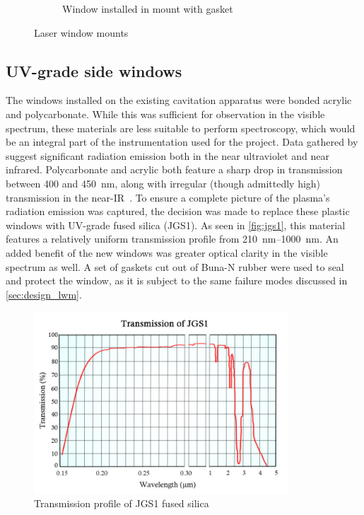 \begin{figure}[h]
\begin{subfigure}[t]{0.48\textwidth}
                    \caption{Window installed in mount with gasket}
                    \label{fig:windowMount_installed}
                \end{subfigure}
                \caption{Laser window mounts}
                \label{fig:windowMount}
            \end{figure}

        \subsection{UV-grade side windows}
            The windows installed on the existing cavitation apparatus were bonded acrylic and polycarbonate. While this was sufficient for observation in the visible spectrum, these materials are less suitable to perform spectroscopy, which would be an integral part of the instrumentation used for the project. Data gathered by \textcite{zimakovInteractionNearIRLaser2016,luCharacteristicDiagnosticsLaserStabilized2022} suggest significant radiation emission both in the near ultraviolet and near infrared. Polycarbonate and acrylic both feature a sharp drop in transmission between 400 and 450~\unit{nm}, along with irregular (though admittedly high) transmission in the near-IR~\cite{gsplasticopticsTransmissionCurvesOptics}. To ensure a complete picture of the plasma's radiation emission was captured, the decision was made to replace these plastic windows with UV-grade fused silica (JGS1). As seen in \autoref{fig:jgs1}, this material features a relatively uniform transmission profile from \qtyrange{210}{1000}{nm}. An added benefit of the new windows was greater optical clarity in the visible spectrum as well. A set of gaskets cut out of Buna-N rubber were used to seal and protect the window, as it is subject to the same failure modes discussed in \autoref{sec:design_lwm}.

            \begin{figure}[h]
                \centering
                \includegraphics[width=0.85\textwidth, clip, trim=0 0 0 15pt]{assets/3 design/jgs1_transmission.jpg}
                \caption[Transmission profile of JGS1 fused silica]{Transmission profile of JGS1 fused silica~\cite{shalomeoJGS1}}
                \label{fig:jgs1}
            \end{figure}

